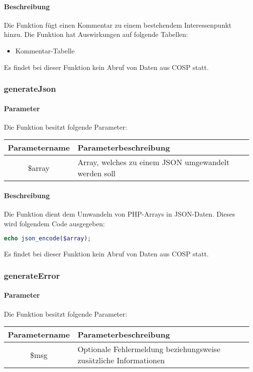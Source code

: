 \paragraph{Beschreibung} Die Funktion fügt einen Kommentar zu einem bestehendem Interessenpunkt hinzu. Die Funktion hat Auswirkungen auf folgende Tabellen:
\begin{itemize}
	\item Kommentar-Tabelle
\end{itemize}
Es findet bei dieser Funktion kein Abruf von Daten aus {\glqq COSP\grqq} statt.
\subsubsection{generateJson}
\paragraph{Parameter} Die Funktion besitzt folgende Parameter:
\begin{table}[H]
	\begin{tabular}{|c|p{11cm}|}
		\hline
		\textbf{Parametername} & \textbf{Parameterbeschreibung} \\ \hline
		\$array & Array, welches zu einem JSON umgewandelt werden soll \\ \hline
	\end{tabular}
\end{table}
\paragraph{Beschreibung} Die Funktion dient dem Umwandeln von PHP-Arrays in JSON-Daten. Dieses wird folgendem Code ausgegeben:
\begin{lstlisting}[language=php]
echo json_encode($array);
\end{lstlisting}
Es findet bei dieser Funktion kein Abruf von Daten aus {\glqq COSP\grqq} statt.
\subsubsection{generateError}
\paragraph{Parameter} Die Funktion besitzt folgende Parameter:
\begin{table}[H]
	\begin{tabular}{|c|p{11cm}|}
		\hline
		\textbf{Parametername} & \textbf{Parameterbeschreibung} \\ \hline
		\$msg & Optionale Fehlermeldung beziehungsweise zusätzliche Informationen \\ \hline
	\end{tabular}
\end{table}
